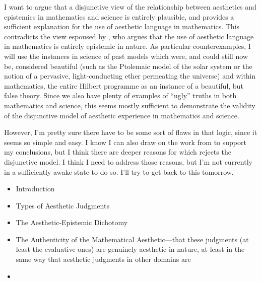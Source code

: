 \documentclass[a4paper,man,natbib]{apa6}
\begin{document}
I want to argue that a disjunctive view of the relationship between aesthetics and epistemics in mathematics
and science is entirely plausible, and provides a sufficient explanation for the use of aesthetic language
in mathematics. This contradicts the view espoused by \cite{todd_unmasking_2008}, who argues that the
use of aesthetic language in mathematics is entirely epistemic in nature. As particular counterexamples,
I will use the instances in science of past models which were, and could still now be, considered beautiful (such
as the Ptolemaic model of the solar system or the notion of a pervasive, light-conducting ether permeating the
universe) and within mathematics, the entire Hilbert programme as an instance of a beautiful, but false theory.
Since we also have plenty of examples of ``ugly'' truths in both mathematics and science, this seems mostly sufficient
to demonstrate the validity of the disjunctive model of aesthetic experience in mathematics and science.

However, I'm pretty sure there have to be some sort of flaws in that logic, since it seems so simple and easy. I know
I can also draw on the work from \cite{inglis_beauty_2015} to support my conclusions, but I think there are deeper
reasons for which \cite{todd_unmasking_2008} rejects the disjunctive model. I think I need to address those reasons,
but I'm not currently in a sufficiently awake state to do so. I'll try to get back to this tomorrow.

\begin{itemize}
      \item Introduction
      \item Types of Aesthetic Judgments
      \item The Aesthetic-Epistemic Dichotomy

      \item The Authenticity of the Mathematical Aesthetic---that these judgments (at least the evaluative ones) are
      genuinely aesthetic in nature, at least in the same way that aesthetic judgments in other domains are
      \item 
\end{itemize}



\end{document}
